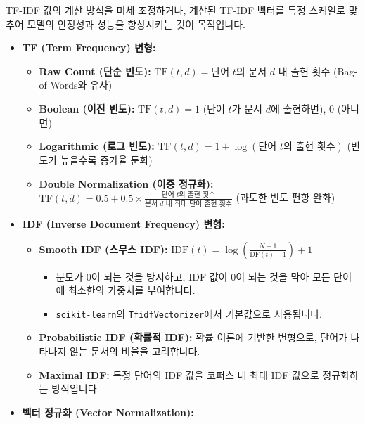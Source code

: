 \documentclass[11pt,a4paper]{article}
\begin{document}
\begin{tcolorbox}[mybox, title=TF-IDF 변형 및 정규화의 목적]
TF-IDF 값의 계산 방식을 미세 조정하거나, 계산된 TF-IDF 벡터를 특정 스케일로 맞추어 모델의 안정성과 성능을 향상시키는 것이 목적입니다.
\end{tcolorbox}

\begin{itemize}
    \item \textbf{TF (Term Frequency) 변형:}
    \begin{itemize}
        \item \textbf{Raw Count (단순 빈도):} $\text{TF}(t, d) = \text{단어 } t \text{의 문서 } d \text{ 내 출현 횟수}$ (Bag-of-Words와 유사)
        \item \textbf{Boolean (이진 빈도):} $\text{TF}(t, d) = 1$ (단어 $t$가 문서 $d$에 출현하면), $0$ (아니면)
        \item \textbf{Logarithmic (로그 빈도):} $\text{TF}(t, d) = 1 + \log(\text{단어 } t \text{의 출현 횟수})$ (빈도가 높을수록 증가율 둔화)
        \item \textbf{Double Normalization (이중 정규화):} $\text{TF}(t, d) = 0.5 + 0.5 \times \frac{\text{단어 } t \text{의 출현 횟수}}{\text{문서 } d \text{ 내 최대 단어 출현 횟수}}$ (과도한 빈도 편향 완화)
    \end{itemize}
    \item \textbf{IDF (Inverse Document Frequency) 변형:}
    \begin{itemize}
        \item \textbf{Smooth IDF (스무스 IDF):} $\text{IDF}(t) = \log \left( \frac{N + 1}{\text{DF}(t) + 1} \right) + 1$
            \begin{itemize}
                \item 분모가 0이 되는 것을 방지하고, IDF 값이 0이 되는 것을 막아 모든 단어에 최소한의 가중치를 부여합니다.
                \item \texttt{scikit-learn}의 \texttt{TfidfVectorizer}에서 기본값으로 사용됩니다.
            \end{itemize}
        \item \textbf{Probabilistic IDF (확률적 IDF):} 확률 이론에 기반한 변형으로, 단어가 나타나지 않는 문서의 비율을 고려합니다.
        \item \textbf{Maximal IDF:} 특정 단어의 IDF 값을 코퍼스 내 최대 IDF 값으로 정규화하는 방식입니다.
    \end{itemize}
    \item \textbf{벡터 정규화 (Vector Normalization):}
    \begin{itemize}

\end{itemize}
\end{itemize}
\end{document}
